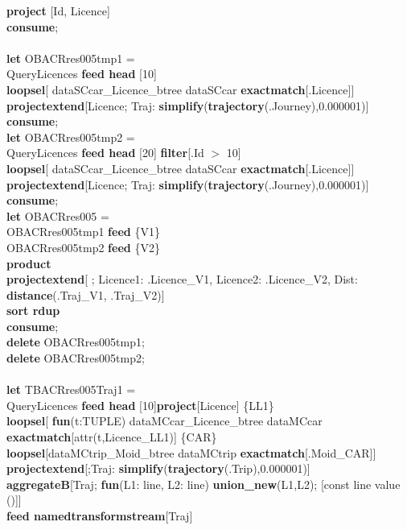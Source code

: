 \documentclass[a4paper]{article}
\newcommand{\op}[1]{\textbf{#1}}
\begin{document}
\begin{scriptsize}
\begin{tabbing}
\>\op{project} [Id, Licence]\\
\op{consume};\\
\\
\op{let} OBACRres005tmp1 =\\
\>QueryLicences \op{feed head} [10]\\
\>\op{loopsel}[ dataSCcar\_Licence\_btree dataSCcar \op{exactmatch}[.Licence]]\\
\>\op{projectextend}[Licence; Traj: \op{simplify}(\op{trajectory}(.Journey),0.000001)]\\
\op{consume};\\
\op{let} OBACRres005tmp2 =\\
\>QueryLicences \op{feed head} [20] \op{filter}[.Id $>$ 10]\\
\>\op{loopsel}[ dataSCcar\_Licence\_btree dataSCcar \op{exactmatch}[.Licence]]\\
\>\op{projectextend}[Licence; Traj: \op{simplify}(\op{trajectory}(.Journey),0.000001)]\\
\op{consume};\\
\op{let} OBACRres005 = \\
\>OBACRres005tmp1 \op{feed} \{V1\}\\
\>OBACRres005tmp2 \op{feed} \{V2\}\\
\>\op{product}\\
\>\op{projectextend}[ ; Licence1: .Licence\_V1, Licence2: .Licence\_V2, Dist: \op{distance}(.Traj\_V1, .Traj\_V2)]\\
\>\op{sort rdup}\\
\op{consume};\\
\op{delete} OBACRres005tmp1;\\
\op{delete} OBACRres005tmp2;\\
\\
\op{let} TBACRres005Traj1 =\\
\>QueryLicences \op{feed head} [10]\op{project}[Licence] \{LL1\}\\
\>\op{loopsel}[ \op{fun}(t:TUPLE) dataMCcar\_Licence\_btree dataMCcar \op{exactmatch}[attr(t,Licence\_LL1)] \{CAR\}\\
\>\>\op{loopsel}[dataMCtrip\_Moid\_btree dataMCtrip \op{exactmatch}[.Moid\_CAR]]\\
\>\op{projectextend}[;Traj: \op{simplify}(\op{trajectory}(.Trip),0.000001)]\\
\>\op{aggregateB}[Traj; \op{fun}(L1: line, L2: line)\op{ union\_new}(L1,L2); [const line value ()]]\\
\>\op{feed namedtransformstream}[Traj]\\

\end{tabbing}
\end{scriptsize}
\end{document}
